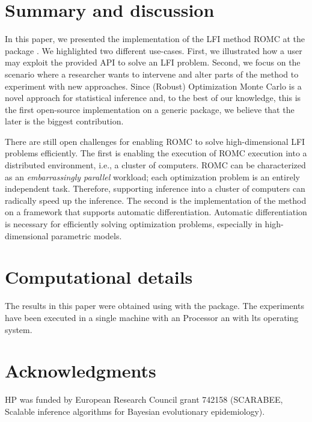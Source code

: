 \documentclass[article, shortnames]{jss}
\begin{document}
\section{Summary and discussion} \label{sec:summary}

In this paper, we presented the implementation of the LFI method ROMC
at the  package . We highlighted two
different use-cases. First, we illustrated how a user may exploit the
provided API to solve an LFI problem. Second, we focus on the scenario
where a researcher wants to intervene and alter parts of the method to
experiment with new approaches. Since (Robust) Optimization Monte
Carlo is a novel approach for statistical inference and, to the best
of our knowledge, this is the first open-source implementation on a
generic package, we believe that the later is the biggest
contribution.

There are still open challenges for enabling ROMC to solve
high-dimensional LFI problems efficiently. The first is enabling the
execution of ROMC execution into a distributed environment, i.e., a
cluster of computers. ROMC can be characterized as an
\textit{embarrassingly parallel} workload; each optimization problem
is an entirely independent task. Therefore, supporting inference into
a cluster of computers can radically speed up the inference. The
second is the implementation of the method on a framework that supports
automatic differentiation. Automatic differentiation is necessary for
efficiently solving optimization problems, especially in
high-dimensional parametric models.



\section*{Computational details}

The results in this paper were obtained using 
with the  package. The experiments have been executed
in a single machine with an  Processor
an with  lts operating system.

\section*{Acknowledgments}

HP was funded by European Research Council grant 742158 (SCARABEE,
Scalable inference algorithms for Bayesian evolutionary epidemiology).

\clearpage


\end{document}

